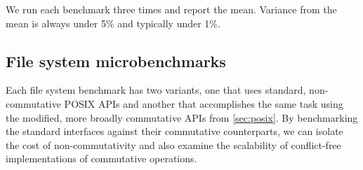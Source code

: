 We run each benchmark three times and report the mean.  Variance from
the mean is always under 5\% and typically under 1\%.

\subsection{File system microbenchmarks}
\label{sec:eval:fs-microbenchmarks}




Each file system benchmark has
two variants, one that uses standard, non-commutative POSIX APIs and
another that accomplishes the same task using the modified, more broadly
commutative APIs from \cref{sec:posix}.
%
By benchmarking the standard interfaces against
their commutative counterparts, we can isolate the cost of
non-commutativity and also examine the scalability of
conflict-free implementations of commutative operations.

